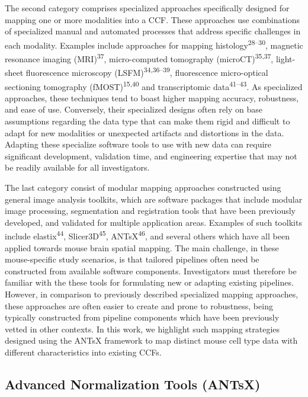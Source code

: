\documentclass[
  12pt,
]{article}
\begin{document}
The second category comprises specialized approaches specifically
designed for mapping one or more modalities into a CCF. These approaches
use combinations of specialized manual and automated processes that
address specific challenges in each modality. Examples include
approaches for mapping histology\textsuperscript{28--30}, magnetic
resonance imaging (MRI)\textsuperscript{37}, micro-computed tomography
(microCT)\textsuperscript{35,37}, light-sheet fluorescence microscopy
(LSFM)\textsuperscript{34,36--39}, fluorescence micro-optical sectioning
tomography (fMOST)\textsuperscript{15,40} and transcriptomic
data\textsuperscript{41--43}. As specialized approaches, these
techniques tend to boast higher mapping accuracy, robustness, and ease
of use. Conversely, their specialized designs often rely on base
assumptions regarding the data type that can make them rigid and
difficult to adapt for new modalities or unexpected artifacts and
distortions in the data. Adapting these specialize software tools to use
with new data can require significant development, validation time, and
engineering expertise that may not be readily available for all
investigators.

The last category consist of modular mapping approaches constructed
using general image analysis toolkits, which are software packages that
include modular image processing, segmentation and registration tools
that have been previously developed, and validated for multiple
application areas. Examples of such toolkits include
elastix\textsuperscript{44}, Slicer3D\textsuperscript{45},
ANTsX\textsuperscript{46}, and several others which have all been
applied towards mouse brain spatial mapping. The main challenge, in
these mouse-specific study scenarios, is that tailored pipelines often
need be constructed from available software components. Investigators
must therefore be familiar with the these tools for formulating new or
adapting existing pipelines. However, in comparison to previously
described specialized mapping approaches, these approaches are often
easier to create and prone to robustness, being typically constructed
from pipeline components which have been previously vetted in other
contexts. In this work, we highlight such mapping strategies designed
using the ANTsX framework to map distinct mouse cell type data with
different characteristics into existing CCFs.

\subsection{Advanced Normalization Tools
(ANTsX)}\label{advanced-normalization-tools-antsx}
\end{document}
